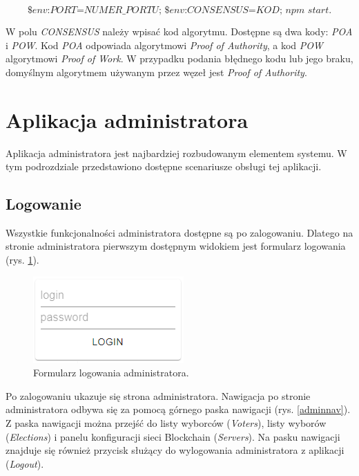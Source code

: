 \documentclass[a4paper,12pt]{book}
\begin{document}
\begin{equation}
	\textit{\$env:PORT=NUMER\_PORTU; \$env:CONSENSUS=KOD; npm start}.
\end{equation}

W polu \textit{CONSENSUS} należy wpisać kod algorytmu. Dostępne są dwa kody: \textit{POA} i \textit{POW}. Kod \textit{POA} odpowiada algorytmowi \textit{Proof of Authority}, a kod \textit{POW} algorytmowi \textit{Proof of Work}. W przypadku podania błędnego kodu lub jego braku, domyślnym algorytmem używanym przez węzeł jest \textit{Proof of Authority}.

\newpage

\section{Aplikacja administratora}

Aplikacja administratora jest najbardziej rozbudowanym elementem systemu. W tym podrozdziale przedstawiono dostępne scenariusze obsługi tej aplikacji.

\subsection{Logowanie}

Wszystkie funkcjonalności administratora dostępne są po zalogowaniu. Dlatego na stronie administratora pierwszym dostępnym widokiem jest formularz logowania (rys. \ref{adminlogin}).

\begin{figure}[h]
	\centering
	\includegraphics[width=\textwidth]{images/adminlogin.png}
	\caption{Formularz logowania administratora.}\label{adminlogin}
\end {figure}

Po zalogowaniu ukazuje się strona administratora. Nawigacja po stronie administratora odbywa się za pomocą górnego paska nawigacji (rys. \ref{adminnav}). Z paska nawigacji można przejść do listy wyborców (\textit{Voters}), listy wyborów (\textit{Elections}) i panelu konfiguracji sieci Blockchain (\textit{Servers}). Na pasku nawigacji znajduje się również przycisk służący do wylogowania administratora z aplikacji (\textit{Logout}).
\end{document}
